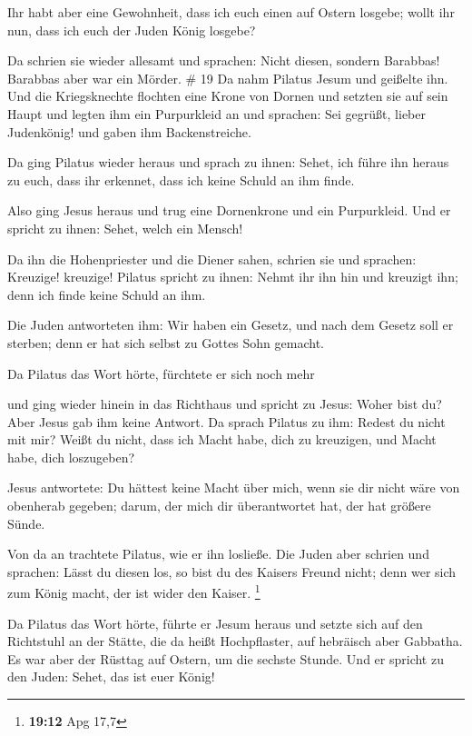  Ihr habt aber eine Gewohnheit, dass ich euch einen auf
Ostern losgebe; wollt ihr nun, dass ich euch der Juden König losgebe?

 Da schrien sie wieder allesamt und sprachen: Nicht
diesen, sondern Barabbas! Barabbas aber war ein Mörder. \# 19
 Da nahm Pilatus Jesum und geißelte ihn. 
Und die Kriegsknechte flochten eine Krone von Dornen und setzten sie auf
sein Haupt und legten ihm ein Purpurkleid an  und
sprachen: Sei gegrüßt, lieber Judenkönig! und gaben ihm Backenstreiche.

 Da ging Pilatus wieder heraus und sprach zu ihnen: Sehet,
ich führe ihn heraus zu euch, dass ihr erkennet, dass ich keine Schuld
an ihm finde.

 Also ging Jesus heraus und trug eine Dornenkrone und ein
Purpurkleid. Und er spricht zu ihnen: Sehet, welch ein Mensch!

 Da ihn die Hohenpriester und die Diener sahen, schrien
sie und sprachen: Kreuzige! kreuzige! Pilatus spricht zu ihnen: Nehmt
ihr ihn hin und kreuzigt ihn; denn ich finde keine Schuld an ihm.

 Die Juden antworteten ihm: Wir haben ein Gesetz, und nach
dem Gesetz soll er sterben; denn er hat sich selbst zu Gottes Sohn
gemacht.

 Da Pilatus das Wort hörte, fürchtete er sich noch mehr

 und ging wieder hinein in das Richthaus und spricht zu
Jesus: Woher bist du? Aber Jesus gab ihm keine Antwort. 
Da sprach Pilatus zu ihm: Redest du nicht mit mir? Weißt du nicht, dass
ich Macht habe, dich zu kreuzigen, und Macht habe, dich loszugeben?

 Jesus antwortete: Du hättest keine Macht über mich, wenn
sie dir nicht wäre von obenherab gegeben; darum, der mich dir
überantwortet hat, der hat größere Sünde.

 Von da an trachtete Pilatus, wie er ihn losließe. Die
Juden aber schrien und sprachen: Lässt du diesen los, so bist du des
Kaisers Freund nicht; denn wer sich zum König macht, der ist wider den
Kaiser. \footnote{\textbf{19:12} Apg 17,7}

 Da Pilatus das Wort hörte, führte er Jesum heraus und
setzte sich auf den Richtstuhl an der Stätte, die da heißt Hochpflaster,
auf hebräisch aber Gabbatha.  Es war aber der Rüsttag auf
Ostern, um die sechste Stunde. Und er spricht zu den Juden: Sehet, das
ist euer König!

